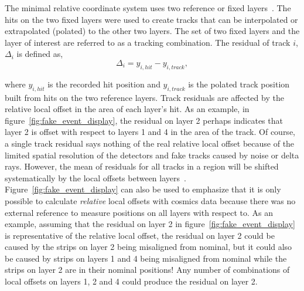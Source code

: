 
The minimal relative coordinate system uses two reference or fixed layers~\cite{lefebvre_thesis}. The hits on the two fixed layers were used to create tracks that can be interpolated or extrapolated (polated) to the other two layers. The set of two fixed layers and the layer of interest are referred to as a tracking combination. The residual of track $i$, $\Delta_i$ is defined as,
\begin{equation}
    \Delta_i = y_{i,hit} - y_{i,track},
    \label{eqn:residual}
\end{equation}

where $y_{i,hit}$ is the recorded hit position and $y_{i,track}$ is the polated track position built from hits on the two reference layers. Track residuals are affected by the relative local offset in the area of each layer's hit. As an example, in figure~\ref{fig:fake_event_display}, the residual on layer 2 perhaps indicates that layer 2 is offset with respect to layers 1 and 4 in the area of the track. Of course, a single track residual says nothing of the real relative local offset because of the limited spatial resolution of the detectors and fake tracks caused by noise or delta rays. However, the mean of residuals for all tracks in a region will be shifted systematically by the local offsets between layers~\cite{lefebvre_thesis}. Figure~\ref{fig:fake_event_display} can also be used to emphasize that it is only possible to calculate \textit{relative} local offsets with cosmics data because there was no external reference to measure positions on all layers with respect to. As an example, assuming that the residual on layer 2 in figure~\ref{fig:fake_event_display} is representative of the relative local offset, the residual on layer 2 could be caused by the strips on layer 2 being misaligned from nominal, but it could also be caused by strips on layers 1 and 4 being misaligned from nominal while the strips on layer 2 are in their nominal positions! Any number of combinations of local offsets on layers 1, 2 and 4 could produce the residual on layer 2.

